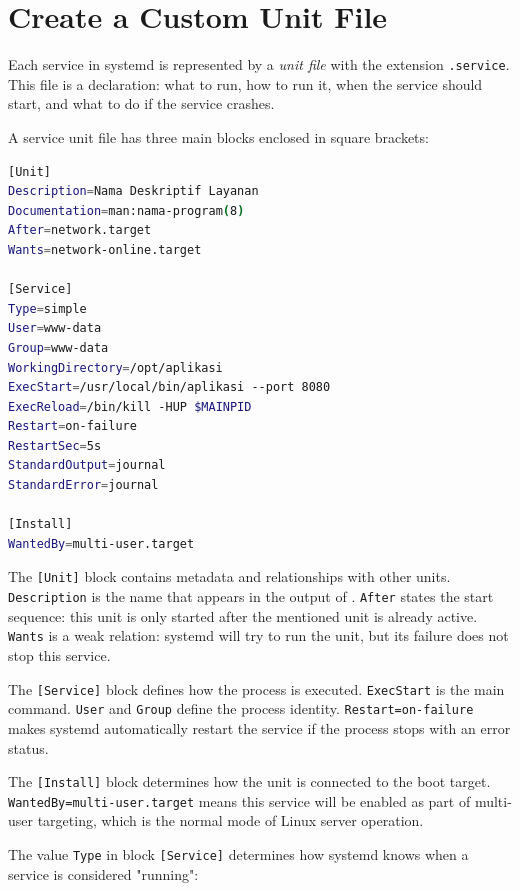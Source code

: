 \section{Create a Custom Unit File}
\label{sec:unit-files}

Each service in systemd is represented by a \textit{unit file} with the extension \texttt{.service}. This file is a declaration: what to run, how to run it, when the service should start, and what to do if the service crashes.

A service unit file has three main blocks enclosed in square brackets:

\begin{lstlisting}[language=bash, caption={.service unit file structure}]
[Unit]
Description=Nama Deskriptif Layanan
Documentation=man:nama-program(8)
After=network.target
Wants=network-online.target

[Service]
Type=simple
User=www-data
Group=www-data
WorkingDirectory=/opt/aplikasi
ExecStart=/usr/local/bin/aplikasi --port 8080
ExecReload=/bin/kill -HUP $MAINPID
Restart=on-failure
RestartSec=5s
StandardOutput=journal
StandardError=journal

[Install]
WantedBy=multi-user.target
\end{lstlisting}

The \texttt{[Unit]} block contains metadata and relationships with other units. \texttt{Description} is the name that appears in the output of . \texttt{After} states the start sequence: this unit is only started after the mentioned unit is already active. \texttt{Wants} is a weak relation: systemd will try to run the unit, but its failure does not stop this service.

The \texttt{[Service]} block defines how the process is executed. \texttt{ExecStart} is the main command. \texttt{User} and \texttt{Group} define the process identity. \texttt{Restart=on-failure} makes systemd automatically restart the service if the process stops with an error status.

The \texttt{[Install]} block determines how the unit is connected to the boot target. \texttt{WantedBy=multi-user.target} means this service will be enabled as part of multi-user targeting, which is the normal mode of Linux server operation.

The value \texttt{Type} in block \texttt{[Service]} determines how systemd knows when a service is considered "running":

